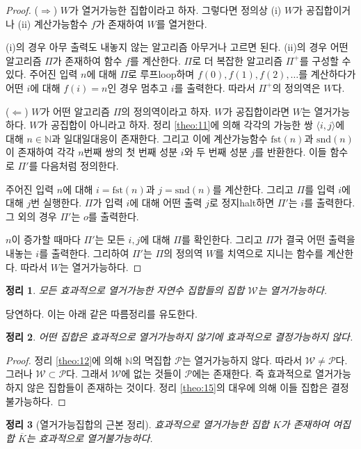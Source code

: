 \documentclass[a4paper,chapter,atbegshi]{oblivoir}
\newtheorem{theo}{정리}[chapter]
\begin{document}
\begin{proof}
  ($\Rightarrow$)
  $W$가 열거가능한 집합이라고 하자. 그렇다면 정의상 (i) $W$가 공집합이거나
  (ii) 계산가능함수 $f$가 존재하여 $W$를 열거한다.

  (i)의 경우 아무 출력도 내놓지 않는 알고리즘 아무거나 고르면 된다.
  (ii)의 경우 어떤 알고리즘 $\Pi$가 존재하여 함수 $f$를 계산한다. $\Pi$로
  더 복잡한 알고리즘 $\Pi^+$를 구성할 수 있다. 주어진 입력 $n$에 대해 $\Pi$로
  루프{\tiny loop}하며 $f(0),f(1),f(2),\ldots$를 계산하다가 어떤 $i$에 대해
  $f(i)=n$인 경우 멈추고 $i$를 출력한다. 따라서 $\Pi^+$의 정의역은
  $W$다. 

  ($\Leftarrow$) $W$가 어떤 알고리즘 $\Pi$의 정의역이라고 하자. $W$가 공집합이라면
  $W$는 열거가능하다. $W$가 공집합이 아니라고 하자. 정리 \ref{theo:11}에 의해
  각각의 가능한 쌍 $\langle i,j\rangle$에 대해 $n\in\mathbb{N}$과 일대일대응이
  존재한다. 그리고 이에 계산가능함수 $\textrm{fst}(n)$과 $\textrm{snd}(n)$이
  존재하여 각각 $n$번째 쌍의 첫 번째 성분 $i$와 두 번째 성분 $j$를 반환한다. 
  이들 함수로 $\Pi'$를 다음처럼 정의한다.

  주어진 입력 $n$에 대해 $i=\textrm{fst}(n)$과 $j=\textrm{snd}(n)$를 계산한다.
  그리고 $\Pi$를 입력 $i$에 대해 $j$번 실행한다. $\Pi$가 입력 $i$에
  대해 어떤 출력 $j$로 정지{\tiny halt}하면 $\Pi'$는 $i$를 출력한다. 
  그 외의 경우 $\Pi'$는 $o$를 출력한다.

  $n$이 증가할 때마다 $\Pi'$는 모든 $i,j$에 대해 $\Pi$를 확인한다. 그리고 
  $\Pi$가 결국 어떤 출력을 내놓는 $i$를 출력한다. 그리하여 $\Pi'$는
  $\Pi$의 정의역 $W$를 치역으로 지니는 함수를 계산한다. 따라서 $W$는
  열거가능하다.
\end{proof}
\begin{theo}
  모든 효과적으로 열거가능한 자연수 집합들의 집합 $\mathcal{W}$는 열거가능하다.
\end{theo}
당연하다. 이는 아래 같은 따름정리를 유도한다.
\begin{theo}
  어떤 집합은 효과적으로 열거가능하지 않기에 효과적으로 결정가능하지 않다.
\end{theo}
\begin{proof}
  정리 \ref{theo:12}에 의해 $\mathbb{N}$의 멱집합 $\mathcal{P}$는 열거가능하지
  않다. 따라서 $\mathcal{W}\neq\mathcal{P}$다. 그러나 $\mathcal{W}\subset
  \mathcal{P}$다. 그래서 $\mathcal{W}$에 없는 것들이 $\mathcal{P}$에는 존재한다.
  즉 효과적으로 열거가능하지 않은 집합들이 존재하는 것이다.
  정리 \ref{theo:15}의 대우에 의해 이들 집합은 결정불가능하다.
\end{proof}
\begin{theo}[열거가능집합의 근본 정리]
  효과적으로 열거가능한 집합 $K$가 존재하여 여집합 $\overline{K}$는
  효과적으로 열거불가능하다.
\end{theo}
\end{document}
